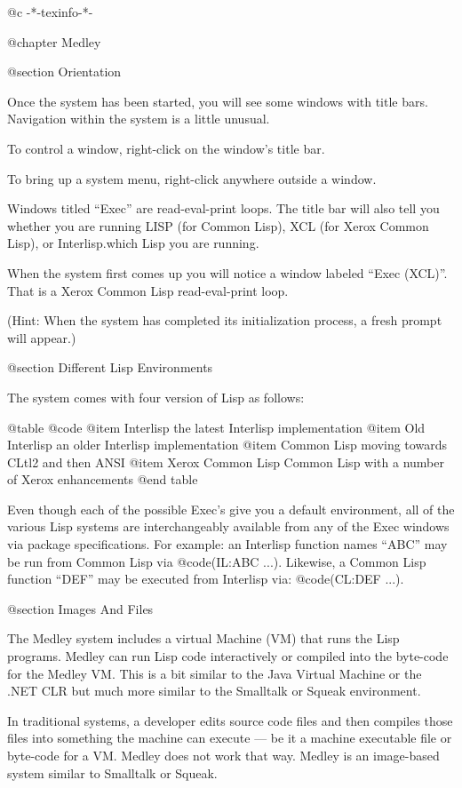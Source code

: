 @c -*-texinfo-*-

@chapter Medley

@section Orientation

Once the system has been started, you will see some windows with title bars.
Navigation within the system is a little unusual.

To control a window, right-click on the window's title bar.

To bring up a system menu, right-click anywhere outside a window.

Windows titled ``Exec'' are read-eval-print loops.  The title bar will
also tell you whether you are running LISP (for Common Lisp), XCL (for
Xerox Common Lisp), or Interlisp.which Lisp you are running. 

When the system first comes up you will notice a window labeled ``Exec (XCL)''.
That is a Xerox Common Lisp read-eval-print loop.

(Hint: When the system has completed its initialization process, a
fresh prompt will appear.)

@section Different Lisp Environments

The system comes with four version of Lisp as follows:

@table @code
@item Interlisp
the latest Interlisp implementation
@item Old Interlisp
an older Interlisp implementation
@item Common Lisp
moving towards CLtl2 and then ANSI
@item Xerox Common Lisp
Common Lisp with a number of Xerox enhancements
@end table

Even though each of the possible Exec's give you a default environment,
all of the various Lisp systems are interchangeably available from any of the
Exec windows via package specifications.  For example: an Interlisp function
names ``ABC'' may be run from Common Lisp via @code{(IL:ABC ...)}.  Likewise,
a Common Lisp function ``DEF'' may be executed from Interlisp via: 
@code{(CL:DEF ...)}.

@section Images And Files

The Medley system includes a virtual Machine (VM) that runs the Lisp programs.
Medley can run Lisp code interactively or compiled into the byte-code for the
Medley VM.  This is a bit similar to the Java Virtual Machine or the .NET CLR but
much more similar to the Smalltalk or Squeak environment.

In traditional systems, a developer edits source code files and then
compiles those files into something the machine can execute --- be it
a machine executable file or byte-code for a VM.  Medley does not work
that way.  Medley is an image-based system similar to Smalltalk or Squeak.

